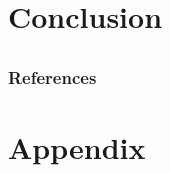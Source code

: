 \documentclass{beamer}
\begin{document}
\section{Conclusion}
\subsection{}
\begin{frame}%
  \frametitle{}

\end{frame}

\subsection{}
\begin{frame}
  \frametitle{References}
  \def\newblock{\hskip .11em plus .33em minus .07em}
  
  
\end{frame}

\section{Appendix}
\subsection{}
\begin{frame}%
  \frametitle{}

\end{frame}

\subsection{}
\begin{frame}%
  \frametitle{}

\end{frame}
\end{document}
